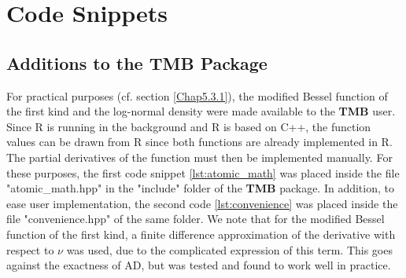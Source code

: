 
\chapter{Code Snippets}
\label{AppendixC}

\section{Additions to the \textbf{TMB} Package}

For practical purposes (cf. section \ref{Chap5.3.1}), the modified Bessel function of the first kind and the log-normal density were made available to the \textbf{TMB} user.
Since R is running in the background and R is based on C++, the function values can be drawn from R since both functions are already implemented in R.
The partial derivatives of the function must then be implemented manually.
For these purposes, the first code snippet \eqref{lst:atomic_math} was placed inside the file "atomic\_math.hpp" in the "include" folder of the \textbf{TMB} package.
In addition, to ease user implementation, the second code \eqref{lst:convenience} was placed inside the file "convenience.hpp" of the same folder.
We note that for the modified Bessel function of the first kind, a finite difference approximation of the derivative with respect to $\nu$ was used, due to the complicated expression of this term.
This goes against the exactness of AD, but was tested and found to work well in practice.

